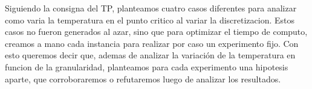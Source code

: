 Siguiendo la consigna del TP, planteamos cuatro casos diferentes para analizar como varia la temperatura 
en el punto critico al variar la discretizacion. Estos casos no fueron
generados al azar, sino que para optimizar el tiempo de computo, creamos a mano cada instancia para 
realizar por caso un experimento fijo. Con esto queremos decir que, ademas de 
analizar la variaci\'on de la temperatura en funcion de la granularidad, planteamos para cada experimento 
una hipotesis aparte, que corroboraremos o 
refutaremos luego de analizar los resultados.


